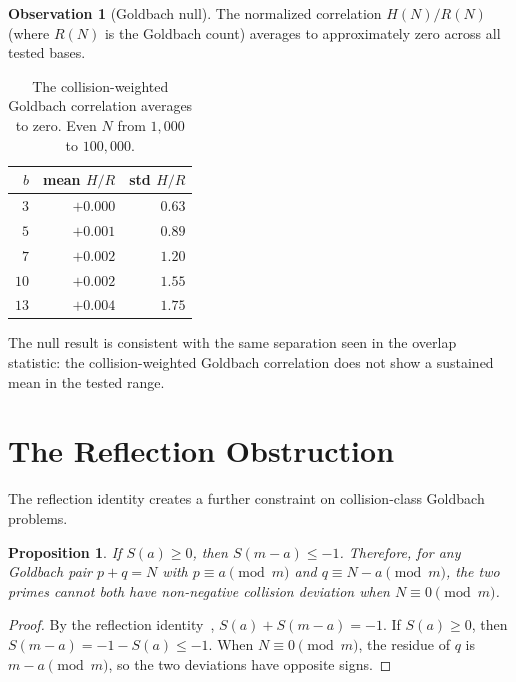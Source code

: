 \documentclass[12pt]{amsart}
\newtheorem{proposition}[theorem]{Proposition}
\theoremstyle{definition}
\newtheorem{observation}[theorem]{Observation}
\theoremstyle{remark}
\begin{document}
\begin{observation}[Goldbach null]\leavevmode\newline
The normalized correlation
$H(N)/R(N)$ (where $R(N)$ is the Goldbach count)
averages to approximately zero across all tested
bases.
\end{observation}

\begin{table}[h]
\centering
\begin{tabular}{rrr}
\toprule
$b$ & mean $H/R$ & std $H/R$ \\
\midrule
$3$ & $+0.000$ & $0.63$ \\
$5$ & $+0.001$ & $0.89$ \\
$7$ & $+0.002$ & $1.20$ \\
$10$ & $+0.002$ & $1.55$ \\
$13$ & $+0.004$ & $1.75$ \\
\bottomrule
\end{tabular}
\caption{The collision-weighted Goldbach correlation
averages to zero. Even $N$ from $1{,}000$ to
$100{,}000$.}
\label{tab:goldbach}
\end{table}

The null result is consistent with the same separation
seen in the overlap statistic: the collision-weighted
Goldbach correlation does not show a sustained mean in
the tested range.

\section{The Reflection Obstruction}

The reflection identity creates a further constraint
on collision-class Goldbach problems.

\begin{proposition}\label{prop:obstruction}
If $S(a) \ge 0$, then $S(m{-}a) \le -1$. Therefore,
for any Goldbach pair $p + q = N$ with
$p \equiv a \pmod{m}$ and $q \equiv N{-}a \pmod{m}$,
the two primes cannot both have non-negative collision
deviation when $N \equiv 0 \pmod{m}$.
\end{proposition}

\begin{proof}
By the reflection identity~\cite{paperA},
$S(a) + S(m{-}a) = -1$. If $S(a) \ge 0$, then
$S(m{-}a) = -1 - S(a) \le -1$.
When $N \equiv 0 \pmod{m}$, the residue of $q$ is
$m - a \pmod{m}$, so the two deviations have
opposite signs.
\end{proof}
\end{document}
